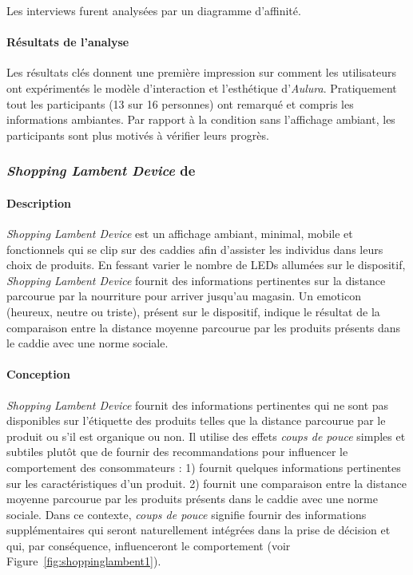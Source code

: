 \documentclass[10pt,a5paper,twoside]{article}
\begin{document}
Les interviews furent analysées par un diagramme d'affinité.

\paragraph{Résultats de l'analyse}\label{ruxe9sultats-de-lanalyse-1}

Les résultats clés donnent une première impression sur comment les
utilisateurs ont expérimentés le modèle d'interaction et l'esthétique
d'\emph{Aulura}. Pratiquement tout les participants (13 sur 16
personnes) ont remarqué et compris les informations ambiantes. Par
rapport à la condition sans l'affichage ambiant, les participants sont
plus motivés à vérifier leurs progrès.

\subsubsection{\emph{Shopping Lambent Device} de
\citet{kalnikaite2011nudge}}\label{shopping-lambent-device-de-kalnikaite2011nudge}

\paragraph{Description}\label{description-4}

\emph{Shopping Lambent Device} est un affichage ambiant, minimal, mobile
et fonctionnels qui se clip sur des caddies afin d'assister les
individus dans leurs choix de produits. En fessant varier le nombre de
LEDs allumées sur le dispositif, \emph{Shopping Lambent Device} fournit
des informations pertinentes sur la distance parcourue par la nourriture
pour arriver jusqu'au magasin. Un emoticon (heureux, neutre ou triste),
présent sur le dispositif, indique le résultat de la comparaison entre
la distance moyenne parcourue par les produits présents dans le caddie
avec une norme sociale.

\paragraph{Conception}\label{conception-4}

\emph{Shopping Lambent Device} fournit des informations pertinentes qui
ne sont pas disponibles sur l'étiquette des produits telles que la
distance parcourue par le produit ou s'il est organique ou non. Il
utilise des effets \emph{coups de pouce} simples et subtiles plutôt que
de fournir des recommandations pour influencer le comportement des
consommateurs : 1) fournit quelques informations pertinentes sur les
caractéristiques d'un produit. 2) fournit une comparaison entre la
distance moyenne parcourue par les produits présents dans le caddie avec
une norme sociale. Dans ce contexte, \emph{coups de pouce} signifie
fournir des informations supplémentaires qui seront naturellement
intégrées dans la prise de décision et qui, par conséquence,
influenceront le comportement (voir Figure~\ref{fig:shoppinglambent1}).
\end{document}
